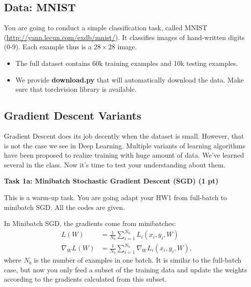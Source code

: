 \subsection*{Data: MNIST}

You are going to conduct a simple classification task, called MNIST (\url{http://yann.lecun.com/exdb/mnist/}). It classifies images of hand-written digits (0-9). Each example thus is a \(28 \times 28\) image. 
\begin{itemize}
\item The full dataset contains 60k training examples and 10k testing examples.
\item We provide \textbf{download.py} that will automatically download the data. Make sure that torchvision library is available.
\end{itemize}



\subsection{Gradient Descent Variants}

Gradient Descent does its job decently when the dataset is small. However, that is not the case we see in Deep Learning. Multiple variants of learning algorithms have been proposed to realize training with huge amount of data. We've learned several in the class. Now it's time to test your understanding about them.

\hfill

\noindent \textbf{Task 1a: Minibatch Stochastic Gradient Descent (SGD) {\bf (1 pt)}} 

\hfill

\noindent This is a warm-up task. You are going adapt your HW1 from full-batch to minibatch SGD.
All the codes are given.


\hfill

\noindent In Minibatch SGD, the gradients come from minibatches:
\begin{align}
    L(W) &= \frac{1}{N_b} \sum_{i=1}^{N_b} L_i(x_i, y_i, W) \\
    \nabla_W L(W) &= \frac{1}{N_b} \sum_{i=1}^{N_b} \nabla_W L_i(x_i, y_i, W),
\end{align}
where $N_b$ is the number of examples in one batch. It is similar to the full-batch case, but now you only feed a subset of the training data and update the weights according to the gradients calculated from this subset.

\hfill

